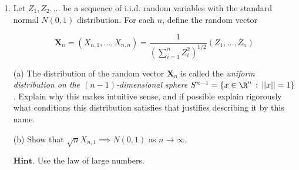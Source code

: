 \begin{enumerate}[label=\arabic*.]
Let $S_n = \sum_{k=1}^n X_k$. Assume that we know
that $S_n=k$, but don't know the value of $U$. What
is our subjective estimate of the probability
distribution of $U$ given this information? Show that
the conditional distribution of $U$ given that
$S_n = k$ is the beta distribution
$\textrm{Beta}(k+1,n-k+1)$. In other words, show that

\[
\mathrm{P}(U \le x\ |\ S_n = k) = \frac{1}{B(k,n-k)} \int_0^x u^k (1-u)^{n-k}\,du, \qquad (0\le x\le 1).
\]

\noindent Note: This problem has been whimsically suggested by
Laplace in the 18th century as a way to estimate the
probability that the sun will rise tomorrow, given the
knowledge that it has risen in the last $n$ days. (Of
course, this assumes the unlikely theological scenario
whereby at the dawn of history, a $U(0,1)$ random
number $U$ was drawn, and that subsequently, every
day an independent experiment was performed with
probability $U$ of success, such that if the
experiment is successful then the sun rises.)

$\textbf{Hint.}$ Use the following density version of
the total probability formula: If $A$ is an event and
$X$ is a random variable with density $f_X$, then

\[
\mathrm{P}(A) = \int_{\R} f_X(u) \mathrm{P}(A\ |\ X=u)\,du.
\]

\noindent Note that we have not defined what it means to
condition on a 0-probability event (this is a somewhat
delicate subject that we will not discuss in this
quarter) --- but don't worry about it, it is possible
to use the formula in computations anyway and get
results.

\item Let $Z_1,Z_2,\ldots$ be a sequence of i.i.d. random
variables with the standard normal $N(0,1)$
distribution. For each $n$, define the random vector

\[
\mathbf{X}_n = (X_{n,1},\ldots,X_{n,n}) = \frac{1}{\left(\sum_{i=1}^n Z_i^2\right)^{1/2}}
(Z_1,\ldots,Z_n)
\]

\noindent (a) The distribution of the random vector
$\mathbf{X}_n$ is called the \emph{uniform distribution on
the $(n-1)$-dimensional sphere
$S^{n-1}=\{ x\in \R^n\,:\, ||x||=1 \}$}. Explain why
this makes intuitive sense, and if possible explain
rigorously what conditions this distribution satisfies
that justifies describing it by this name.

(b) Show that $\sqrt{n} X_{n,1} \implies N(0,1)$ as
$n\to\infty$.

$\textbf{Hint.}$ Use the law of large numbers.


\end{enumerate}
